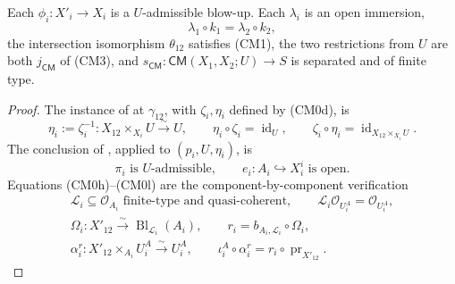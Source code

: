 \begin{lemma}
  \label{lemma:nagata-common-modification}
  \lean{}

  Each $\phi_i\colon X'_i\to X_i$ is a $U$-admissible blow-up.  Each
  $\lambda_i$ is an open immersion,
  \[
    \lambda_1\circ k_1=\lambda_2\circ k_2,
  \]
  the intersection isomorphism $\theta_{12}$ satisfies (CM1), the two
  restrictions from $U$ are both $j_{\mathsf{CM}}$ of (CM3), and
  \(s_{\mathsf{CM}}\colon\mathsf{CM}(X_1,X_2;U)\to S\) is separated
  and of finite type.
\end{lemma}

\begin{proof}
  The instance of  at
  \(\gamma_{12}\), with \(\zeta_i,\eta_i\) defined by (CM0d), is
  \[
    \eta_i:=\zeta_i^{-1}\colon
      X_{12}\times_{X_i}U\xrightarrow{\sim}U,\qquad
      \eta_i\circ\zeta_i=\operatorname{id}_U,\qquad
    \zeta_i\circ\eta_i
      =\operatorname{id}_{X_{12}\times_{X_i}U}.
  \]
  The conclusion of , applied to
  $(p_i,U,\eta_i)$, is
  \[
    \pi_i\text{ is }U\text{-admissible},
    \qquad e_i\colon A_i\hookrightarrow X_i^i\text{ is open}.
  \]
  Equations (CM0h)--(CM0l) are the component-by-component verification
  \[
  \begin{gathered}
    \mathcal L_i\subseteq\mathcal O_{A_i}
      \text{ finite-type and quasi-coherent},\qquad
    \mathcal L_i\mathcal O_{U_i^A}=\mathcal O_{U_i^A},\\
    \Omega_i\colon X'_{12}\xrightarrow{\sim}
      \operatorname{Bl}_{\mathcal L_i}(A_i),\qquad
    r_i=b_{A_i,\mathcal L_i}\circ\Omega_i,\\
    \alpha_i^r\colon X'_{12}\times_{A_i}U_i^A
      \xrightarrow{\sim}U_i^A,\qquad
    \iota_i^A\circ\alpha_i^r
      =r_i\circ\operatorname{pr}_{X'_{12}}.

\end{gathered}\]
\end{proof}

